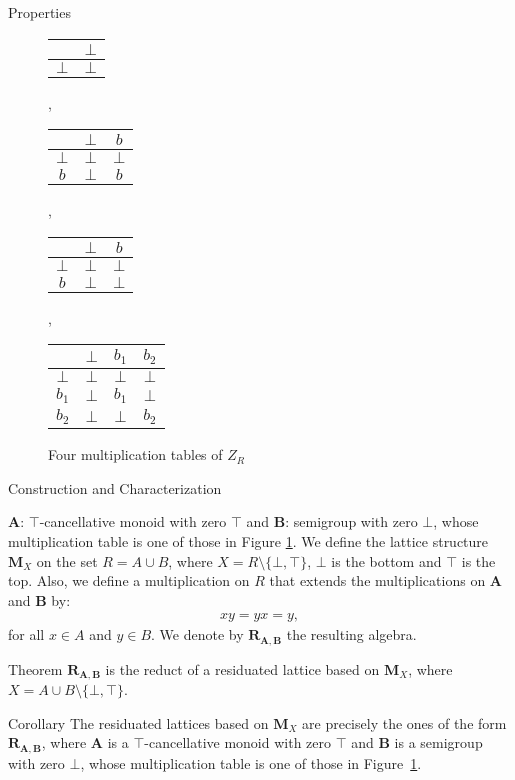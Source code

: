 \documentclass[professionalfont, 10pt]{beamer} %
\theoremstyle{plain}
\theoremstyle{definition}
\begin{document}
\begin{frame}{Properties}
\begin{figure}[h]
\begin{center}
\begin{tabular}{c | c}
 & $\bot$\\
\hline
$\bot$ & $\bot$ 
\end{tabular}
,
\begin{tabular}{c | c c}
 & $\bot$ & $b$\\
\hline
$\bot$ & $\bot$ & $\bot$\\
$b$ & $\bot$ & $b$
\end{tabular}
,
\begin{tabular}{c | c c}
 & $\bot$ & $b$\\
\hline
$\bot$ & $\bot$ & $\bot$\\
$b$ & $\bot$ & $\bot$
\end{tabular}
,
\begin{tabular}{c | c c c}
 & $\bot$ & $b_1$ & $b_2$\\
\hline
$\bot$ & $\bot$ & $\bot$ & $\bot$\\
$b_1$ & $\bot$ & $b_1$ & $\bot$\\
$b_2$ & $\bot$ & $\bot$ & $b_2$ 	
\end{tabular}
\end{center}
\caption{Four multiplication tables of $Z_R$}
\label{f:4tables}
\end{figure}

\end{frame}

\begin{frame}{Construction and Characterization}

$\mathbf{A}$: $\top$-cancellative monoid with zero $\top$ and $\mathbf{B}$: semigroup with zero $\bot$, whose multiplication table is one of those in Figure \ref{f:4tables}.\pause
We define the lattice structure $\mathbf{M}_X$ on the set $R = A \cup B$, where $X = R \setminus \{\bot, \top\}$, $\bot$ is the bottom and $\top$ is the top. \pause
Also, we define a multiplication on $R$ that extends the multiplications on $\mathbf{A}$ and $\mathbf{B}$ by:
\begin{align*}
    xy = yx = y,
\end{align*}
for all $x \in A$ and $y \in B$.
We denote by $\mathbf{R}_{\mathbf{A}, \mathbf{B}}$ the resulting algebra.\pause

\begin{block}{Theorem}
    $\mathbf{R}_{\mathbf{A}, \mathbf{B}}$ is the reduct of a residuated lattice based on $\mathbf{M}_X$, where $X = A \cup B \setminus \{\bot, \top\}$.
\end{block}
\pause

\begin{block}{Corollary}
    The residuated lattices based on $\mathbf{M}_X$ are precisely the ones of the form $\mathbf{R}_{\mathbf{A}, \mathbf{B}}$, where $\mathbf{A}$ is a $\top$-cancellative monoid with zero $\top$ and $\mathbf{B}$ is a semigroup with zero $\bot$, whose multiplication table is one of those in Figure~\ref{f:4tables}.
\end{block}
\end{frame}
\end{document}
